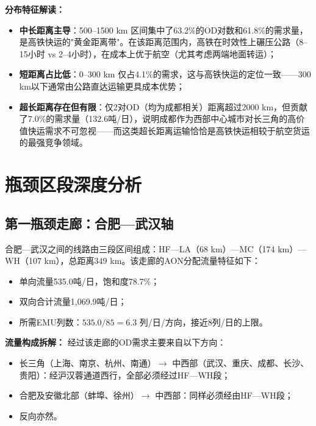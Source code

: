 \documentclass[12pt,a4paper,fontset=none]{ctexart}
\begin{document}
\textbf{分布特征解读：}

\begin{itemize}
    \item \textbf{中长距离主导}：500--1500 km 区间集中了63.2\%的OD对数和61.8\%的需求量，是高铁快运的"黄金距离带"。在该距离范围内，高铁在时效性上碾压公路（8--15小时 vs 2--4小时），在成本上优于航空（尤其考虑两端地面转运）；
    \item \textbf{短距离占比低}：0--300 km 仅占4.1\%的需求，这与高铁快运的定位一致——300 km以下通常由公路直达运输更具成本优势；
    \item \textbf{超长距离存在但有限}：仅2对OD（均为成都相关）距离超过2000 km，但贡献了7.0\%的需求量（132.6吨/日），说明成都作为西部中心城市对长三角的高价值快运需求不可忽视——而这类超长距离运输恰恰是高铁快运相较于航空货运的最强竞争领域。
\end{itemize}

\section{瓶颈区段深度分析}

\subsection{第一瓶颈走廊：合肥—武汉轴}

合肥—武汉之间的线路由三段区间组成：HF—LA（68 km）—MC（174 km）—WH（107 km），总距离349 km。该走廊的AON分配流量特征如下：

\begin{itemize}
    \item 单向流量535.0吨/日，饱和度78.7\%；
    \item 双向合计流量1,069.9吨/日；
    \item 所需EMU列数：$535.0 / 85 = 6.3$ 列/日/方向，接近8列/日的上限。
\end{itemize}

\textbf{流量构成拆解：} 经过该走廊的OD需求主要来自以下方向：
\begin{itemize}
    \item 长三角（上海、南京、杭州、南通）$\to$ 中西部（武汉、重庆、成都、长沙、贵阳）：经沪汉蓉通道西行，全部必须经过HF—WH段；
    \item 合肥及安徽北部（蚌埠、徐州）$\to$ 中西部：同样必须经由HF—WH段；
    \item 反向亦然。
\end{itemize}
\end{document}
